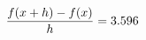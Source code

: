 \documentclass[preview]{standalone}
\begin{document}
\begin{align*}
\special{dvisvgm:raw <g id='unique000'>}\frac{f(x+h)-f(x)}{h} = 3.596\special{dvisvgm:raw </g>}
\end{align*}
\end{document}
